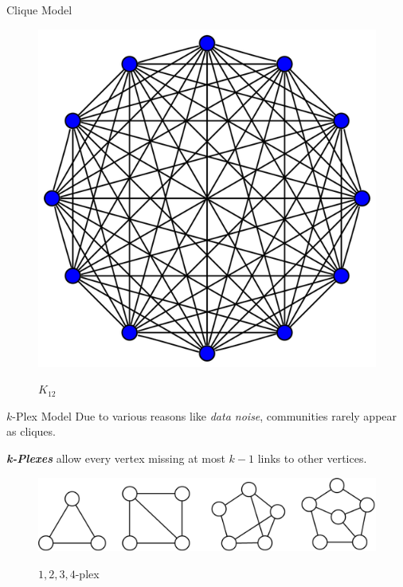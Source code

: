 \documentclass[9pt]{beamer} %
\begin{document}
\begin{frame}{Clique Model}
\begin{minipage}{0.4\linewidth}
\begin{figure}[h]
            \includegraphics[height=.3\textheight]{pic/k12.png}\\
            \caption{$K_{12}$}
        \end{figure}
    \end{minipage}
\end{frame}
\begin{frame}{$k$-Plex Model}
    Due to various reasons like \emph{data noise}, communities rarely appear as cliques.
    
    \textbf{\emph{k-Plexes}} allow every vertex missing at most $k-1$ links to other vertices.

    \begin{figure}[h]
        \centering
        \includegraphics[width=0.8\linewidth]{pic/plexes.png}\\
        \caption{$1,2,3,4$-plex}
    \end{figure}
\end{frame}
\end{document}
